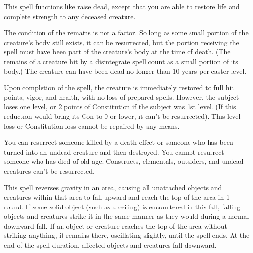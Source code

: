 \begin{multicols}{2}
\begin{small}
\noindent This spell functions like raise dead, except that you are able to restore life and complete strength to any deceased creature.

\smallskip\noindent The condition of the remains is not a factor. So long as some small portion of the creature's body still exists, it can be resurrected, but the portion receiving the spell must have been part of the creature's body at the time of death. (The remains of a creature hit by a disintegrate spell count as a small portion of its body.) The creature can have been dead no longer than 10 years per caster level.

\smallskip\noindent Upon completion of the spell, the creature is immediately restored to full hit points, vigor, and health, with no loss of prepared spells. However, the subject loses one level, or 2 points of Constitution if the subject was 1st level. (If this reduction would bring its Con to 0 or lower, it can't be resurrected). This level loss or Constitution loss cannot be repaired by any means.

\smallskip\noindent You can resurrect someone killed by a death effect or someone who has been turned into an undead creature and then destroyed. You cannot resurrect someone who has died of old age. Constructs, elementals, outsiders, and undead creatures can't be resurrected.


\noindent This spell reverses gravity in an area, causing all unattached objects and creatures within that area to fall upward and reach the top of the area in 1 round. If some solid object (such as a ceiling) is encountered in this fall, falling objects and creatures strike it in the same manner as they would during a normal downward fall. If an object or creature reaches the top of the area without striking anything, it remains there, oscillating slightly, until the spell ends. At the end of the spell duration, affected objects and creatures fall downward.


\end{small}
\end{multicols}
